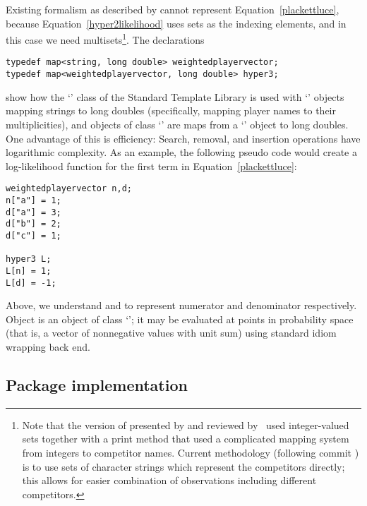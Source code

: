 \documentclass[article]{jss}
\begin{document}
Existing  formalism as described by \citet{hankin2017}
cannot represent Equation~\ref{plackettluce}, because
Equation~\ref{hyper2likelihood} uses sets as the indexing elements,
and in this case we need multisets\footnote{Note that the version of
 presented by \citet{hankin2017} and reviewed
by~\cite{turner2020} used integer-valued sets together with a print
method that used a complicated mapping system from integers to
competitor names.  Current methodology (following commit
  ) is to use sets of character strings which represent
the competitors directly; this allows for easier combination of
observations including different competitors.}.  The declarations
%
\begin{verbatim}
typedef map<string, long double> weightedplayervector;
typedef map<weightedplayervector, long double> hyper3;
\end{verbatim}
%
show how the `' class of the Standard Template Library is
used with `' objects mapping strings to
long doubles (specifically, mapping player names to their
multiplicities), and objects of class `' are maps from
a `' object to long doubles.  One
advantage of this is efficiency: Search, removal, and insertion
operations have logarithmic complexity.  As an example, the following
 pseudo code would create a log-likelihood function for
the first term in Equation~\ref{plackettluce}:
%
\begin{verbatim}
weightedplayervector n,d;
n["a"] = 1; 
d["a"] = 3; 
d["b"] = 2;
d["c"] = 1;

hyper3 L;
L[n] = 1;
L[d] = -1;
\end{verbatim}
%
Above, we understand  and  to represent numerator and
denominator respectively.  Object  is an object of class
`'; it may be evaluated at points in probability space
(that is, a vector \code{[a,b,c]} of nonnegative values with unit sum)
using standard  idiom wrapping  back end.

\subsection{Package implementation}
\end{document}
